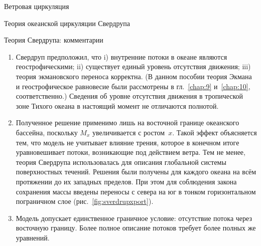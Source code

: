 \begin{chapter}{Ветровая циркуляция}
\begin{section}{Теория океанской циркуляции Свердрупа}
\begin{paragraph}{Теория Свердрупа: комментарии}
\begin{enumerate}
\item 
Свердруп предположил, что 
   i) внутренние потоки в океане являются геострофическими;
  ii) существует единый уровень отсутствия движения;
 iii) теория экмановского переноса корректна.
(В данном пособии теория Экмана и геострофическое равновесие были
рассмотрены в гл.~\ref{chap:9} и~\ref{chap:10}, соответственно.) 
Сведения об уровне отсутствия движения в тропической зоне Тихого океана 
в настоящий момент не отличаются полнотой.
%

\item 
Полученное решение применимо лишь на восточной границе океанского бассейна,
поскольку $M_x$ увеличивается с ростом~$x$. Такой эффект объясняется тем,
что модель не учитывает влияние трения, которое в конечном итоге 
уравновешивает потоки, возникающие под действием ветра. 
Тем не менее, теория Свердрупа использовалась для описания глобальной 
системы поверхностных течений. 
Решения были получены для каждого океана на всём протяжении до их 
западных пределов. При этом для соблюдения закона сохранения массы 
введены переносы с севера на юг в тонком горизонтальном пограничном слое
(рис.~\ref{fig:sverdrupxport}).
%

\item 
Модель допускает единственное граничное условие: отсутствие потока через
восточную границу. Более полное описание потоков требует более полных же
уравнений.
%


\end{enumerate}
\end{paragraph}
\end{section}
\end{chapter}
